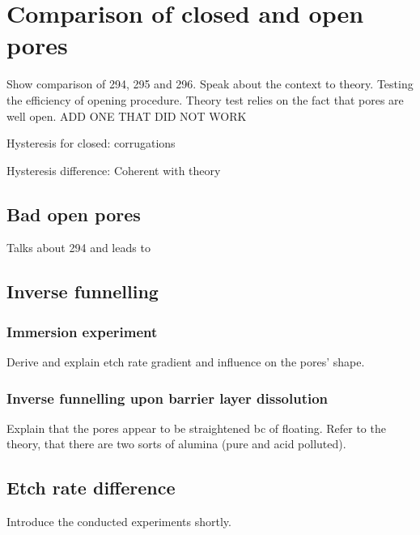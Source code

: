 \documentclass[../thesis.tex]{subfiles}
\begin{document}
      \section{Comparison of closed and open pores}
      \label{sec:comparison-cp-op}

        Show comparison of 294, 295 and 296. Speak about the context to theory. Testing the efficiency of opening procedure. Theory test relies on the fact that pores are well open. ADD ONE THAT DID NOT WORK

        Hysteresis for closed: corrugations

        Hysteresis difference: Coherent with theory


        \subsection{Bad open pores}

          Talks about 294 and leads to


        \subsection{Inverse funnelling}

                \subsubsection{Immersion experiment}
                \label{subsec:immersion-experiment}

                  Derive and explain etch rate gradient and influence on the pores' shape.


                \subsubsection{Inverse funnelling upon barrier layer dissolution}
                \label{subsec:pore-opening-effect}

                  Explain that the pores appear to be straightened bc of floating. Refer to the theory, that there are two sorts of alumina (pure and acid  polluted).


        \subsection{Etch rate difference}

                Introduce the conducted experiments shortly.
\end{document}
